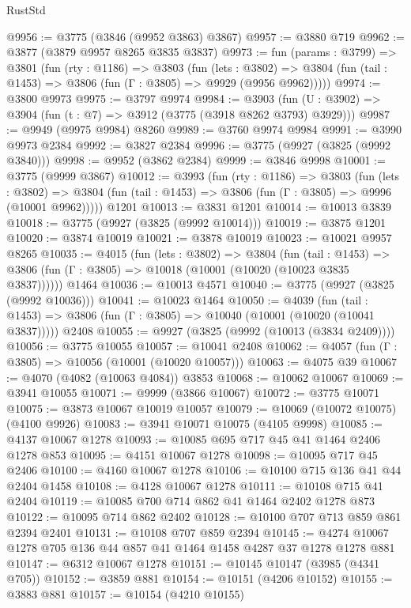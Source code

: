 \begin{lexlean}{RustStd}
\begin{coremodule}
@9956 := @3775 (@3846 (@9952 @3863) @3867)
@9957 := @3880 @719
@9962 := @3877 (@3879 @9957 @8265 @3835 @3837)
@9973 := fun (params : @3799) =>
  @3801
    (fun (rty : @1186) =>
    @3803
      (fun (lets : @3802) =>
      @3804 (fun (tail : @1453) => @3806 (fun (Γ : @3805) => @9929 (@9956 @9962)))))
@9974 := @3800 @9973
@9975 := @3797 @9974
@9984 := @3903 (fun (U : @3902) => @3904 (fun (t : @7) => @3912 (@3775 (@3918 @8262 @3793) @3929)))
@9987 := @9949 (@9975 @9984) @8260
@9989 := @3760 @9974 @9984
@9991 := @3990 @9973 @2384
@9992 := @3827 @2384
@9996 := @3775 (@9927 (@3825 (@9992 @3840)))
@9998 := @9952 (@3862 @2384)
@9999 := @3846 @9998
@10001 := @3775 (@9999 @3867)
@10012 := @3993
    (fun (rty : @1186) =>
    @3803
      (fun (lets : @3802) =>
      @3804 (fun (tail : @1453) => @3806 (fun (Γ : @3805) => @9996 (@10001 @9962)))))
    @1201
@10013 := @3831 @1201
@10014 := @10013 @3839
@10018 := @3775 (@9927 (@3825 (@9992 @10014)))
@10019 := @3875 @1201
@10020 := @3874 @10019
@10021 := @3878 @10019
@10023 := @10021 @9957 @8265
@10035 := @4015
    (fun (lets : @3802) =>
    @3804
      (fun (tail : @1453) =>
      @3806 (fun (Γ : @3805) => @10018 (@10001 (@10020 (@10023 @3835 @3837))))))
    @1464
@10036 := @10013 @4571
@10040 := @3775 (@9927 (@3825 (@9992 @10036)))
@10041 := @10023 @1464
@10050 := @4039
    (fun (tail : @1453) => @3806 (fun (Γ : @3805) => @10040 (@10001 (@10020 (@10041 @3837)))))
    @2408
@10055 := @9927 (@3825 (@9992 (@10013 (@3834 @2409))))
@10056 := @3775 @10055
@10057 := @10041 @2408
@10062 := @4057 (fun (Γ : @3805) => @10056 (@10001 (@10020 @10057)))
@10063 := @4075 @39
@10067 := @4070 (@4082 (@10063 @4084)) @3853
@10068 := @10062 @10067
@10069 := @3941 @10055
@10071 := @9999 (@3866 @10067)
@10072 := @3775 @10071
@10075 := @3873 @10067 @10019 @10057
@10079 := @10069 (@10072 @10075) (@4100 @9926)
@10083 := @3941 @10071 @10075 (@4105 @9998)
@10085 := @4137 @10067 @1278
@10093 := @10085 @695 @717 @45 @41 @1464 @2406 @1278 @853
@10095 := @4151 @10067 @1278
@10098 := @10095 @717 @45 @2406
@10100 := @4160 @10067 @1278
@10106 := @10100 @715 @136 @41 @44 @2404 @1458
@10108 := @4128 @10067 @1278
@10111 := @10108 @715 @41 @2404
@10119 := @10085 @700 @714 @862 @41 @1464 @2402 @1278 @873
@10122 := @10095 @714 @862 @2402
@10128 := @10100 @707 @713 @859 @861 @2394 @2401
@10131 := @10108 @707 @859 @2394
@10145 := @4274 @10067 @1278 @705 @136 @44 @857 @41 @1464 @1458 @4287 @37 @1278 @1278 @881
@10147 := @6312 @10067 @1278
@10151 := @10145 @10147 (@3985 (@4341 @705))
@10152 := @3859 @881
@10154 := @10151 (@4206 @10152)
@10155 := @3883 @881
@10157 := @10154 (@4210 @10155)

\end{coremodule}
\end{lexlean}
